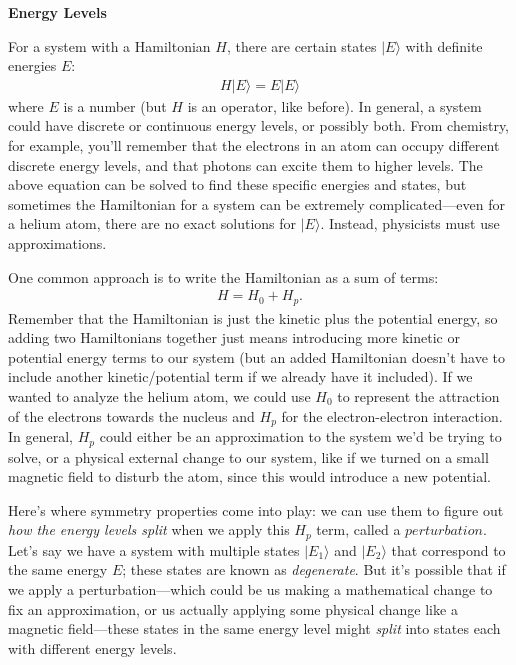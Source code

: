 \noindent
\textbf{Energy Levels}

For a system with a Hamiltonian $H$, there are certain states $|E\rangle$ with definite energies $E$:
\begin{align*}
    H|E\rangle = E|E\rangle
\end{align*}
where $E$ is a number (but $H$ is an operator, like before). In general, a system could have discrete or continuous energy levels, or possibly both. From chemistry, for example, you'll remember that the electrons in an atom can occupy different discrete energy levels, and that photons can excite them to higher levels. The above equation can be solved to find these specific energies and states, but sometimes the Hamiltonian for a system can be extremely complicated---even for a helium atom, there are no exact solutions for $|E\rangle$. Instead, physicists must use approximations.

One common approach is to write the Hamiltonian as a sum of terms:
\begin{align*}
    H = H_0 + H_p.
\end{align*}
Remember that the Hamiltonian is just the kinetic plus the potential energy, so adding two Hamiltonians together just means introducing more kinetic or potential energy terms to our system (but an added Hamiltonian doesn't have to include another kinetic/potential term if we already have it included). If we wanted to analyze the helium atom, we could use $H_0$ to represent the attraction of the electrons towards the nucleus and $H_p$ for the electron-electron interaction. In general, $H_p$ could either be an approximation to the system we'd be trying to solve, or a physical external change to our system, like if we turned on a small magnetic field to disturb the atom, since this would introduce a new potential.

Here's where symmetry properties come into play: we can use them to figure out \emph{how the energy levels split} when we apply this $H_p$ term, called a $perturbation$. Let's say we have a system with multiple states $|E_1\rangle$ and $|E_2\rangle$ that correspond to the same energy $E$; these states are known as \emph{degenerate}. But it's possible that if we apply a perturbation---which could be us making a mathematical change to fix an approximation, or us actually applying some physical change like a magnetic field---these states in the same energy level might \emph{split} into states each with different energy levels.

